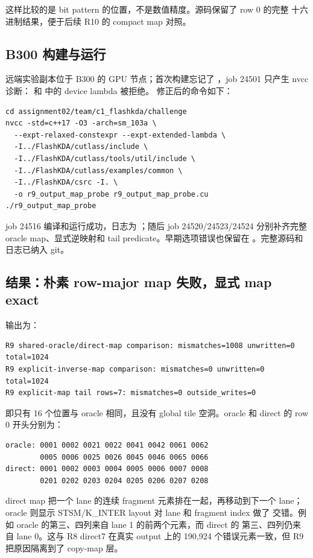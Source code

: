 这样比较的是 bit pattern 的位置，不是数值精度。源码保留了 row 0 的完整
十六进制结果，便于后续 R10 的 compact map 对照。

\subsection{B300 构建与运行}

远端实验副本位于 B300 的 GPU 节点；首次构建忘记了
，job 24501 只产生 nvcc 诊断：
 和  中的 device lambda 被拒绝。
修正后的命令如下：

\begin{lstlisting}
cd assignment02/team/c1_flashkda/challenge
nvcc -std=c++17 -O3 -arch=sm_103a \
  --expt-relaxed-constexpr --expt-extended-lambda \
  -I../FlashKDA/cutlass/include \
  -I../FlashKDA/cutlass/tools/util/include \
  -I../FlashKDA/cutlass/examples/common \
  -I../FlashKDA/csrc -I. \
  -o r9_output_map_probe r9_output_map_probe.cu
./r9_output_map_probe
\end{lstlisting}

job 24516 编译和运行成功，日志为
；随后 job 24520/24523/24524
分别补齐完整 oracle map、显式逆映射和 tail predicate。早期选项错误也保留在
。完整源码和日志已纳入 git。

\subsection{结果：朴素 row-major map 失败，显式 map exact}

输出为：

\begin{lstlisting}
R9 shared-oracle/direct-map comparison: mismatches=1008 unwritten=0 total=1024
R9 explicit-inverse-map comparison: mismatches=0 unwritten=0 total=1024
R9 explicit-map tail rows=7: mismatches=0 outside_writes=0
\end{lstlisting}

即只有 16 个位置与 oracle 相同，且没有 global tile 空洞。oracle 和 direct
的 row 0 开头分别为：

\begin{lstlisting}
oracle: 0001 0002 0021 0022 0041 0042 0061 0062
        0005 0006 0025 0026 0045 0046 0065 0066
direct: 0001 0002 0003 0004 0005 0006 0007 0008
        0201 0202 0203 0204 0205 0206 0207 0208
\end{lstlisting}

direct map 把一个 lane 的连续 fragment 元素排在一起，再移动到下一个
lane；oracle 则显示 STSM/K\_INTER layout 对 lane 和 fragment index 做了
交错。例如 oracle 的第三、四列来自 lane 1 的前两个元素，而 direct 的
第三、四列仍来自 lane 0。这与 R8 direct7 在真实 output 上的
190,924 个错误元素一致，但 R9 把原因隔离到了 copy-map 层。

